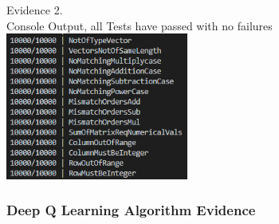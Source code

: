 \begin{center}
    {\large Evidence 2.\rn } \\ 
    \vspace{0.3cm}
    Console Output, all Tests have passed with no failures \\
    \includegraphics[width=6cm]{Images/Testing/T2.23.1.PNG} \\
    \vspace{1cm}
\end{center}

\subsubsection{Deep Q Learning Algorithm Evidence}

